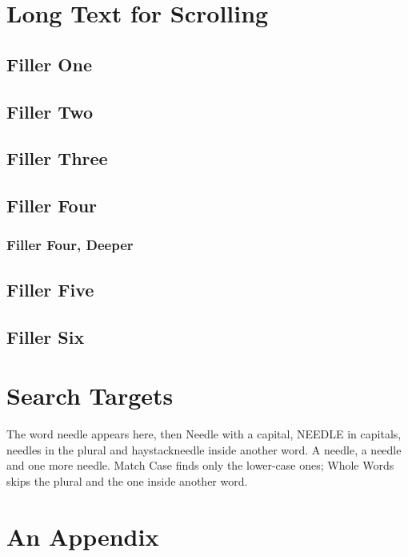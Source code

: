 \documentclass[11pt]{article}
\theoremstyle{definition}
\begin{document}
\section{Long Text for Scrolling}
\subsection{Filler One}   \lipsum[5-12]
\subsection{Filler Two}   \lipsum[13-20]
\subsection{Filler Three} \lipsum[21-28]
\subsection{Filler Four}  \lipsum[29-36]
\subsubsection{Filler Four, Deeper} \lipsum[37-44]
\subsection{Filler Five}  \lipsum[45-52]
\subsection{Filler Six}   \lipsum[53-60]

\section{Search Targets}\label{sec:search}
The word needle appears here, then Needle with a capital, NEEDLE in capitals,
needles in the plural and haystackneedle inside another word. A needle, a
needle and one more needle. Match Case finds only the lower-case ones; Whole
Words skips the plural and the one inside another word.

\appendix
\section{An Appendix}
\lipsum[61-64]
\end{document}
